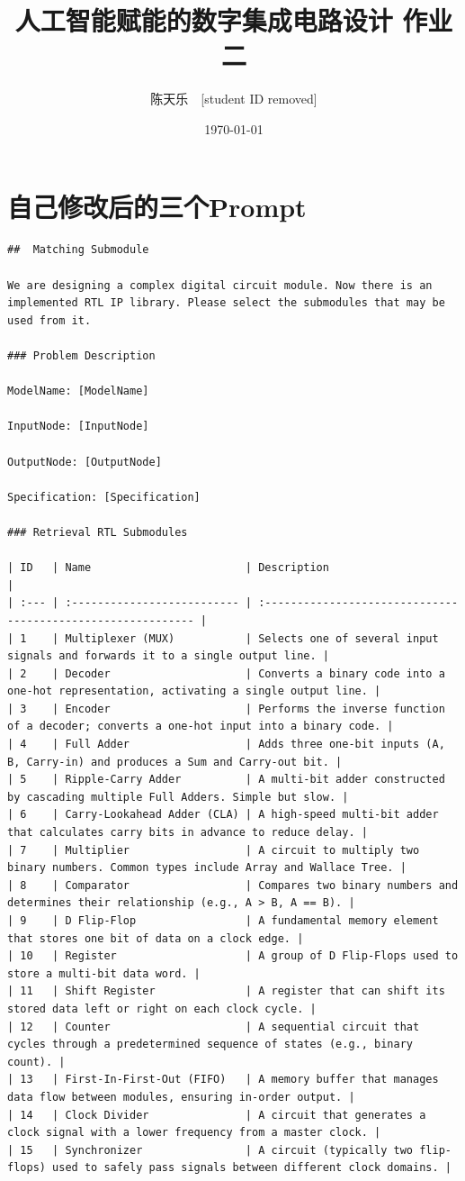 \documentclass[UTF8]{ctexart}
\title{\textbf{人工智能赋能的数字集成电路设计 作业二}}
\author{陈天乐\ \ [student ID removed] }
\date{\today}
\begin{document}
\maketitle
\tableofcontents
\newpage
\section{自己修改后的三个Prompt }
\begin{lstlisting}[frame=shadowbox,caption=Match\_Submodule.md]
##  Matching Submodule

We are designing a complex digital circuit module. Now there is an implemented RTL IP library. Please select the submodules that may be used from it.

### Problem Description

ModelName: [ModelName]

InputNode: [InputNode]

OutputNode: [OutputNode]

Specification: [Specification]

### Retrieval RTL Submodules

| ID   | Name                        | Description                                                  |
| :--- | :-------------------------- | :----------------------------------------------------------- |
| 1    | Multiplexer (MUX)           | Selects one of several input signals and forwards it to a single output line. |
| 2    | Decoder                     | Converts a binary code into a one-hot representation, activating a single output line. |
| 3    | Encoder                     | Performs the inverse function of a decoder; converts a one-hot input into a binary code. |
| 4    | Full Adder                  | Adds three one-bit inputs (A, B, Carry-in) and produces a Sum and Carry-out bit. |
| 5    | Ripple-Carry Adder          | A multi-bit adder constructed by cascading multiple Full Adders. Simple but slow. |
| 6    | Carry-Lookahead Adder (CLA) | A high-speed multi-bit adder that calculates carry bits in advance to reduce delay. |
| 7    | Multiplier                  | A circuit to multiply two binary numbers. Common types include Array and Wallace Tree. |
| 8    | Comparator                  | Compares two binary numbers and determines their relationship (e.g., A > B, A == B). |
| 9    | D Flip-Flop                 | A fundamental memory element that stores one bit of data on a clock edge. |
| 10   | Register                    | A group of D Flip-Flops used to store a multi-bit data word. |
| 11   | Shift Register              | A register that can shift its stored data left or right on each clock cycle. |
| 12   | Counter                     | A sequential circuit that cycles through a predetermined sequence of states (e.g., binary count). |
| 13   | First-In-First-Out (FIFO)   | A memory buffer that manages data flow between modules, ensuring in-order output. |
| 14   | Clock Divider               | A circuit that generates a clock signal with a lower frequency from a master clock. |
| 15   | Synchronizer                | A circuit (typically two flip-flops) used to safely pass signals between different clock domains. |



\end{lstlisting}
\end{document}
